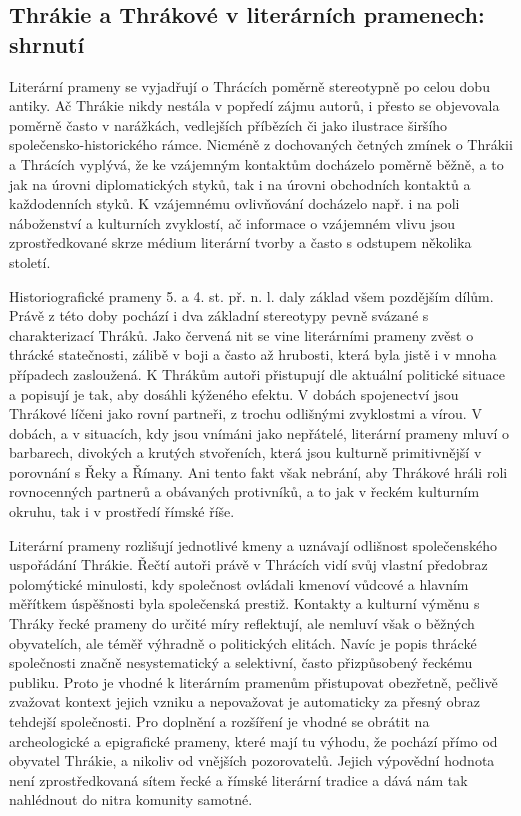 \subsection[thrákie-a-thrákové-v-literárních-pramenech-shrnutí]{Thrákie a Thrákové v literárních pramenech: shrnutí}

Literární prameny se vyjadřují o Thrácích poměrně stereotypně po celou dobu antiky. Ač Thrákie nikdy nestála v popředí zájmu autorů, i přesto se objevovala poměrně často v narážkách, vedlejších příbězích či jako ilustrace širšího společensko-historického rámce. Nicméně z dochovaných četných zmínek o Thrákii a Thrácích vyplývá, že ke vzájemným kontaktům docházelo poměrně běžně, a to jak na úrovni diplomatických styků, tak i na úrovni obchodních kontaktů a každodenních styků. K vzájemnému ovlivňování docházelo např. i na poli náboženství a kulturních zvyklostí, ač informace o vzájemném vlivu jsou zprostředkované skrze médium literární tvorby a často s odstupem několika století.

Historiografické prameny 5. a 4. st. př. n. l. daly základ všem pozdějším dílům. Právě z této doby pochází i dva základní stereotypy pevně svázané s charakterizací Thráků. Jako červená nit se vine literárními prameny zvěst o thrácké statečnosti, zálibě v boji a často až hrubosti, která byla jistě i v mnoha případech zasloužená. K Thrákům autoři přistupují dle aktuální politické situace a popisují je tak, aby dosáhli kýženého efektu. V dobách spojenectví jsou Thrákové líčeni jako rovní partneři, z trochu odlišnými zvyklostmi a vírou. V dobách, a v situacích, kdy jsou vnímáni jako nepřátelé, literární prameny mluví o barbarech, divokých a krutých stvořeních, která jsou kulturně primitivnější v porovnání s Řeky a Římany. Ani tento fakt však nebrání, aby Thrákové hráli roli rovnocenných partnerů a obávaných protivníků, a to jak v řeckém kulturním okruhu, tak i v prostředí římské říše.

Literární prameny rozlišují jednotlivé kmeny a uznávají odlišnost společenského uspořádání Thrákie. Řečtí autoři právě v Thrácích vidí svůj vlastní předobraz polomýtické minulosti, kdy společnost ovládali kmenoví vůdcové a hlavním měřítkem úspěšnosti byla společenská prestiž. Kontakty a kulturní výměnu s Thráky řecké prameny do určité míry reflektují, ale nemluví však o běžných obyvatelích, ale téměř výhradně o politických elitách. Navíc je popis thrácké společnosti značně nesystematický a selektivní, často přizpůsobený řeckému publiku. Proto je vhodné k literárním pramenům přistupovat obezřetně, pečlivě zvažovat kontext jejich vzniku a nepovažovat je automaticky za přesný obraz tehdejší společnosti. Pro doplnění a rozšíření je vhodné se obrátit na archeologické a epigrafické prameny, které mají tu výhodu, že pochází přímo od obyvatel Thrákie, a nikoliv od vnějších pozorovatelů. Jejich výpovědní hodnota není zprostředkovaná sítem řecké a římské literární tradice a dává nám tak nahlédnout do nitra komunity samotné.

